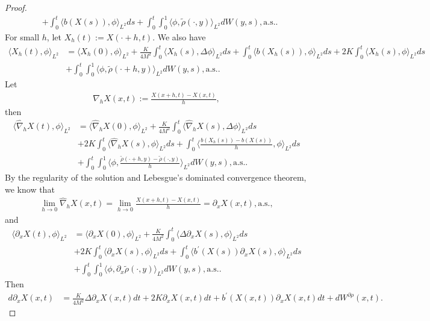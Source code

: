 \documentclass[11pt]{article}
\numberwithin{equation}{section}%
\numberwithin{figure}{section}%
\theoremstyle{remark}
\begin{document}
\begin{proof}
\begin{align*}
			&+\int_{0}^{t}\langle b(X(s)),\phi\rangle_{L^{2}}ds+\int_{0}^{t}\int_{0}^{1} \langle \phi,\tilde{\rho}(\cdot,y)\rangle_{L^{2}}dW(y,s),\text{a.s.}.
		\end{align*}
		For small $h$, let $X_{h}(t):=X(\cdot+h,t)$. We also have
		\begin{align*}
			\langle X_{h}(t),\phi\rangle_{L^{2}}&=\langle X_{h}(0),\phi\rangle_{L^{2}}+\frac{K}{4M^{2}}\int_{0}^{t} \langle X_{h}(s),\Delta \phi\rangle_{L^{2}}ds+\int_{0}^{t}\langle b(X_{h}(s)),\phi\rangle_{L^{2}}ds+2K\int_{0}^{t} \langle X_{h}(s),\phi\rangle_{L^{2}}ds\\
			&+\int_{0}^{t}\int_{0}^{1} \langle \phi,\tilde{\rho}(\cdot+h,y)\rangle_{L^{2}}dW(y,s),\text{a.s.}.
		\end{align*}
		Let 
		\begin{align*}
			\hat{\nabla}_{h}X(x,t):=\frac{X(x+h,t)-X(x,t)}{h},   
		\end{align*}
		then
		\begin{align*}
			\langle \hat{\nabla}_{h}X(t),\phi\rangle_{L^{2}}&=\langle \hat{\nabla}_{h}X(0),\phi\rangle_{L^{2}}+\frac{K}{4M^{2}}\int_{0}^{t} \langle \hat{\nabla}_{h}X(s),\Delta \phi\rangle_{L^{2}}ds\\
			&+2K\int_{0}^{t} \langle \hat{\nabla}_{h}X(s), \phi\rangle_{L^{2}}ds+\int_{0}^{t}\langle \frac{b(X_{h}(s))-b(X(s))}{h},\phi\rangle_{L^{2}}ds\\
			&+\int_{0}^{t}\int_{0}^{1} \langle \phi,\frac{\tilde{\rho}(\cdot+h,y)-\tilde{\rho}(\cdot,y)}{h}\rangle_{L^{2}}dW(y,s),\text{a.s.}.
		\end{align*}
		By the regularity of the solution and Lebesgue's dominated convergence theorem, we know that
		\begin{align*}
		\lim\limits_{h\rightarrow 0}	\hat{\nabla}_{h}X(x,t)=\lim\limits_{h\rightarrow 0}\frac{X(x+h,t)-X(x,t)}{h}=\partial_{x} X(x,t),\text{a.s.},  
		\end{align*}
		and
		\begin{align*}
			\langle \partial_{x} X(t),\phi\rangle_{L^{2}}&=\langle \partial_{x} X(0),\phi\rangle_{L^{2}}+\frac{K}{4M^{2}}\int_{0}^{t} \langle \Delta\partial_{x} X(s), \phi\rangle_{L^{2}}ds\\
			&+2K\int_{0}^{t} \langle \partial_{x} X(s), \phi\rangle_{L^{2}}ds+\int_{0}^{t}\langle b^{\prime}(X(s))\partial_{x}X(s),\phi\rangle_{L^{2}}ds\\
			&+\int_{0}^{t}\int_{0}^{1} \langle \phi,\partial_{x}\tilde{\rho}(\cdot,y)\rangle_{L^{2}}dW(y,s),\text{a.s.}.
		\end{align*}
		Then 
		\begin{align*}
			d\partial_{x}X(x,t)&=\frac{K}{4M^{2}}\Delta  \partial_{x} X(x,t)dt+ 2K\partial_{x}X(x,t)dt+
			b^{\prime}(X(x,t))\partial_{x}X(x,t)dt+dW^{\partial\rho}(x,t).
		\end{align*}
	\end{proof}	
\end{document}
